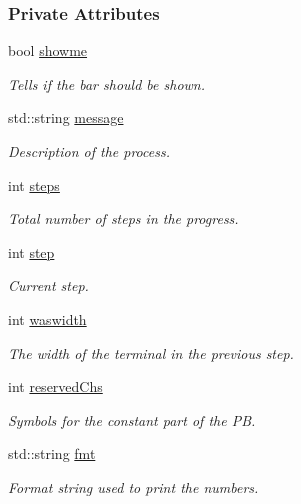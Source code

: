 \subsubsection*{Private Attributes}
\begin{DoxyCompactItemize}
\item 
bool \hyperlink{classProgressBar_ac68fc70a51d5ece6ed58c9d1eee894a0}{showme}
\begin{DoxyCompactList}\small\item\em Tells if the bar should be shown. \item\end{DoxyCompactList}\item 
std::string \hyperlink{classProgressBar_a7fdd22154b95fafd723f087c7c2800f0}{message}
\begin{DoxyCompactList}\small\item\em Description of the process. \item\end{DoxyCompactList}\item 
int \hyperlink{classProgressBar_ac8b6d8289e1c4183a9c1284da9f24f41}{steps}
\begin{DoxyCompactList}\small\item\em Total number of steps in the progress. \item\end{DoxyCompactList}\item 
int \hyperlink{classProgressBar_a306e360a98b4f0a88ce0e88e6a2fda2d}{step}
\begin{DoxyCompactList}\small\item\em Current step. \item\end{DoxyCompactList}\item 
int \hyperlink{classProgressBar_a95c47a5a15f9fad58f92ce62ac4cc163}{waswidth}
\begin{DoxyCompactList}\small\item\em The width of the terminal in the previous step. \item\end{DoxyCompactList}\item 
int \hyperlink{classProgressBar_a5719f553f74549c2c70375a095857e7a}{reservedChs}
\begin{DoxyCompactList}\small\item\em Symbols for the constant part of the PB. \item\end{DoxyCompactList}\item 
std::string \hyperlink{classProgressBar_a17e91afec3e36712d161118634acb9c2}{fmt}
\begin{DoxyCompactList}\small\item\em Format string used to print the numbers. \item\end{DoxyCompactList}\end{DoxyCompactItemize}


